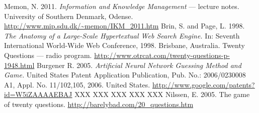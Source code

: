 \documentclass[a4paper]{article}
\begin{document}
\begin{thebibliography}{10}
Memon, N. 2011. \textsl{Information and Knowledge Management} --- lecture notes. University of Southern Denmark, Odense. \url{http://www.mip.sdu.dk/~memon/IKM_2011.htm}
 Brin, S. and Page, L. 1998. \textsl{The Anatomy of a Large-Scale Hypertextual Web Search Engine.} In: Seventh International World-Wide Web Conference, 1998. Brisbane, Australia.
Twenty Questions --- radio program. \url{http://www.otrcat.com/twenty-questions-p-1948.html}
Burgener R. 2005. \textsl{Artificial Neural Network Guessing Method and Game.} United States Patent Application Publication, Pub. No.: 2006/0230008 A1, Appl. No. 11/102,105, 2006. United States. \url{http://www.google.com/patents?id=W5iZAAAAEBAJ}
XXX
XXX
XXX
XXX
XXX
 Nilssen, E. 2005. The game of twenty questions. \url{http://barelybad.com/20_questions.htm}
\end{thebibliography}
\end{document}
